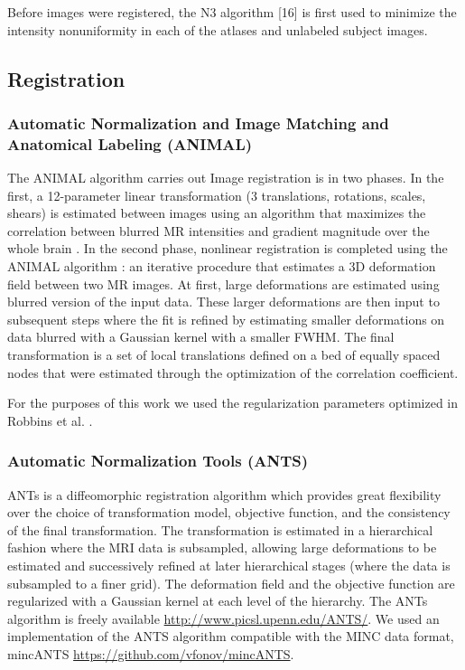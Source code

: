 \documentclass{article}\usepackage{graphicx, color}
\makeatletter
\newenvironment{kframe}{%
 \def\at@end@of@kframe{}%
 \ifinner\ifhmode%
  \def\at@end@of@kframe{\end{minipage}}%
  \begin{minipage}{\columnwidth}%
 \fi\fi%
 \def\FrameCommand##1{\hskip\@totalleftmargin \hskip-\fboxsep
 \colorbox{shadecolor}{##1}\hskip-\fboxsep
     \hskip-\linewidth \hskip-\@totalleftmargin \hskip\columnwidth}%
 \MakeFramed {\advance\hsize-\width
   \@totalleftmargin\z@ \linewidth\hsize
   \@setminipage}}%
 {\par\unskip\endMakeFramed%
 \at@end@of@kframe}
\newcommand{\todo}[1]{\begin{kframe}{\textcolor{red}{TODO #1}}\end{kframe}}
\makeatother
\begin{document}
Before images were registered, the N3 algorithm [16] is first used to minimize
the intensity nonuniformity in each of the atlases and unlabeled subject
images.   



\subsection{Registration}

\subsubsection{Automatic Normalization and Image Matching and Anatomical Labeling (ANIMAL)}
The ANIMAL algorithm carries out Image registration is in two phases. In the
first, a 12-parameter linear transformation (3 translations, rotations, scales,
shears) is estimated between images using an algorithm that maximizes the
correlation between blurred MR intensities and gradient magnitude over the
whole brain \citep{Collins}. In the second phase, nonlinear registration is completed using
the ANIMAL algorithm \citep{Collins1995}: an iterative procedure that estimates a 3D
deformation field between two MR images. At first, large deformations are
estimated using blurred version of the input data. These larger deformations
are then input to subsequent steps where the fit is refined by estimating
smaller deformations on data blurred with a Gaussian kernel with a smaller
FWHM. The final transformation is a set of local translations defined on a bed
of equally spaced nodes that were estimated through the optimization of the
correlation coefficient. 

For the purposes of this work we used the regularization parameters optimized 
in Robbins et al. \citep{Robbins2004}. 

\todo{link to MNI website here}
\todo{command line}


\subsubsection{Automatic Normalization Tools (ANTS)}

ANTs is a diffeomorphic registration algorithm which provides great flexibility
over the choice of transformation model, objective function, and the
consistency of the final transformation. The transformation is estimated in a
hierarchical fashion where the MRI data is subsampled, allowing large
deformations to be estimated and successively refined at later hierarchical
stages (where the data is subsampled to a finer grid). The deformation field
and the objective function are regularized with a Gaussian kernel at each level
of the hierarchy. The ANTs algorithm is freely available
\url{http://www.picsl.upenn.edu/ANTS/}. We used an implementation of the ANTS
algorithm compatible with the MINC data format, mincANTS
\url{https://github.com/vfonov/mincANTS}.
\end{document}
